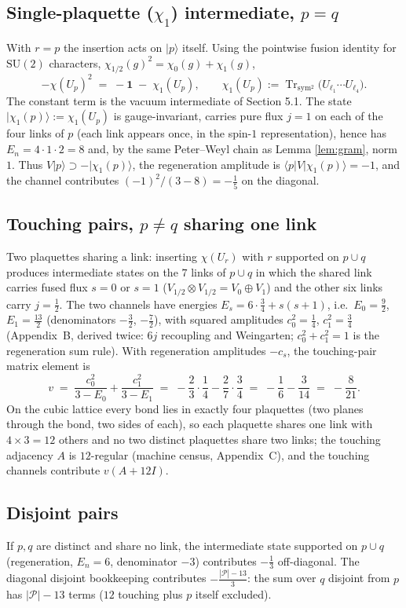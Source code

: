 \documentclass[11pt]{article}
\newcommand{\Tr}{\operatorname{Tr}}
\newcommand{\G}{{\mathrm{SU}}(2)}
\begin{document}
\subsection{Single-plaquette ($\chi_1$) intermediate, $p=q$}\label{subsec:chi1}
With $r=p$ the insertion acts on $|p\rangle$ itself. Using the pointwise
fusion identity for $\G$ characters,
$\chi_{1/2}(g)^2=\chi_0(g)+\chi_1(g)$,
\[
-\chi(U_p)^2 \;=\; -\mathbf 1 \;-\; \chi_1(U_p),
\qquad \chi_1(U_p):=\Tr_{\mathrm{sym}^2}\bigl(U_{\ell_1}\cdots U_{\ell_4}\bigr).
\]
The constant term is the vacuum intermediate of Section 5.1. The state
$|\chi_1(p)\rangle:=\chi_1(U_p)$ is gauge-invariant, carries pure flux
$j=1$ on each of the four links of $p$ (each link appears once, in the
spin-$1$ representation), hence has $E_n=4\cdot 1\cdot 2=8$ and, by the
same Peter--Weyl chain as Lemma \ref{lem:gram}, norm $1$. Thus
$V|p\rangle\supset-|\chi_1(p)\rangle$, the regeneration amplitude is
$\langle p|V|\chi_1(p)\rangle=-1$, and the channel contributes
$(-1)^2/(3-8)=-\tfrac15$ on the diagonal.

\subsection{Touching pairs, $p\ne q$ sharing one link}\label{subsec:touch}
Two plaquettes sharing a link: inserting $\chi(U_r)$ with $r$ supported on
$p\cup q$ produces intermediate states on the $7$ links of $p\cup q$ in
which the shared link carries fused flux $s=0$ or $s=1$
($V_{1/2}\otimes V_{1/2}=V_0\oplus V_1$) and the other six links carry
$j=\tfrac12$. The two channels have energies
$E_s=6\cdot\tfrac34+s(s+1)$, i.e.\ $E_0=\tfrac92$, $E_1=\tfrac{13}{2}$
(denominators $-\tfrac32$, $-\tfrac72$), with squared amplitudes
$c_0^2=\tfrac14$, $c_1^2=\tfrac34$ (Appendix~B, derived twice: $6j$
recoupling and Weingarten; $c_0^2+c_1^2=1$ is the regeneration sum rule).
With regeneration amplitudes $-c_s$, the touching-pair matrix element is
\[
v\;=\;\frac{c_0^2}{3-E_0}+\frac{c_1^2}{3-E_1}
\;=\;-\frac{2}{3}\cdot\frac14-\frac{2}{7}\cdot\frac34
\;=\;-\frac16-\frac{3}{14}\;=\;-\frac{8}{21}.
\]
On the cubic lattice every bond lies in exactly four plaquettes (two planes
through the bond, two sides of each), so each plaquette shares one link with
$4\times 3=12$ others and no two distinct plaquettes share two links; the
touching adjacency $A$ is $12$-regular (machine census, Appendix~C), and the
touching channels contribute $v(A+12I)$.

\subsection{Disjoint pairs}\label{subsec:disjoint}
If $p,q$ are distinct and share no link, the intermediate state supported on
$p\cup q$ (regeneration, $E_n=6$, denominator $-3$) contributes $-\frac13$
off-diagonal. The diagonal disjoint bookkeeping contributes
$-\frac{|\mathcal P|-13}{3}$: the sum over $q$ disjoint from $p$ has
$|\mathcal P|-13$ terms ($12$ touching plus $p$ itself excluded).
\end{document}

